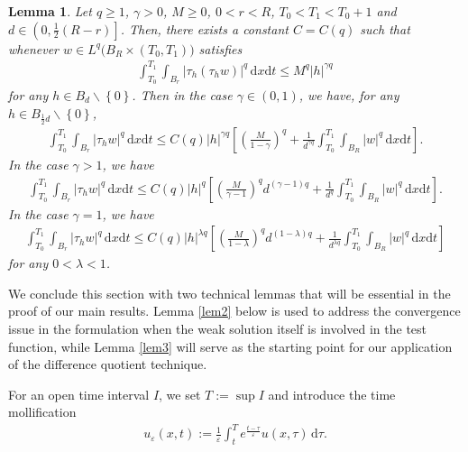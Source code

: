\documentclass[reqno,10pt]{amsart}
\numberwithin{equation}{section}
\newtheorem{lemma}[theorem]{Lemma}
\begin{document}
\begin{lemma}
	\label{lem10}
	Let $q\ge1$, $\gamma>0$, $M\ge0$, $0<r<R$, $T_0<T_1<T_0+1$ and $d\in \left( 0,\frac{1}{2}(R-r)\right] $. Then, there exists a constant $C=C(q)$ such that whenever $w\in L^q\bigl(B_R\times(T_0,T_1)\bigl)$ satisfies
	\begin{align*}
		\int_{T_0}^{T_1}\int_{B_r}|\tau_h(\tau_hw)|^q\,\mathrm{d}x\mathrm{d}t\le M^q|h|^{\gamma q}
	\end{align*}
	for any $h\in B_d\backslash \left\lbrace 0\right\rbrace $. Then in the case $\gamma\in (0,1)$, we have, for any $h\in B_{\frac{1}{2}d}\backslash\left\lbrace 0\right\rbrace $,
	\begin{align*}
		\int_{T_0}^{T_1}\int_{B_r}|\tau_hw|^q\,\mathrm{d}x\mathrm{d}t\le C(q)|h|^{\gamma q}\left[ \left( \frac{M}{1-\gamma}\right)^q+\frac{1}{d^{\gamma q}}\int_{T_0}^{T_1}\int_{B_R}|w|^q\,\mathrm{d}x\mathrm{d}t \right].
	\end{align*}
	In the case $\gamma>1$, we have
	\begin{align*}
		\int_{T_0}^{T_1}\int_{B_r}|\tau_hw|^q\,\mathrm{d}x\mathrm{d}t\le C(q)|h|^q\left[ \left( \frac{M}{\gamma-1}\right)^qd^{(\gamma-1)q}+\frac{1}{d^q}\int_{T_0}^{T_1}\int_{B_R}|w|^q\,\mathrm{d}x\mathrm{d}t \right].
	\end{align*}
	In the case $\gamma=1$, we have
	\begin{align*}
		\int_{T_0}^{T_1}\int_{B_r}|\tau_hw|^q\,\mathrm{d}x\mathrm{d}t\le C(q)|h|^{\lambda q}\left[ \left( \frac{M}{1-\lambda}\right)^qd^{(1-\lambda)q}+\frac{1}{d^{\lambda q}}\int_{T_0}^{T_1}\int_{B_R}|w|^q\,\mathrm{d}x\mathrm{d}t \right] 
	\end{align*}
	for any $0<\lambda<1$.
\end{lemma}

We conclude this section with two technical lemmas that will be essential in the proof of our main results. Lemma \ref{lem2} below is used to address the convergence issue in the formulation when the weak solution itself is involved in the test function, while Lemma \ref{lem3} will serve as the starting point for our application of the difference quotient technique.

For an open time interval $I$, we set $T:=\sup I$ and introduce the time mollification
\begin{align*}
	u_\varepsilon(x,t):=\frac{1}{\varepsilon}\int_t^{T}e^{\frac{t-\tau}{\varepsilon}}u(x,\tau)\,\mathrm{d}\tau.
\end{align*}
\end{document}
